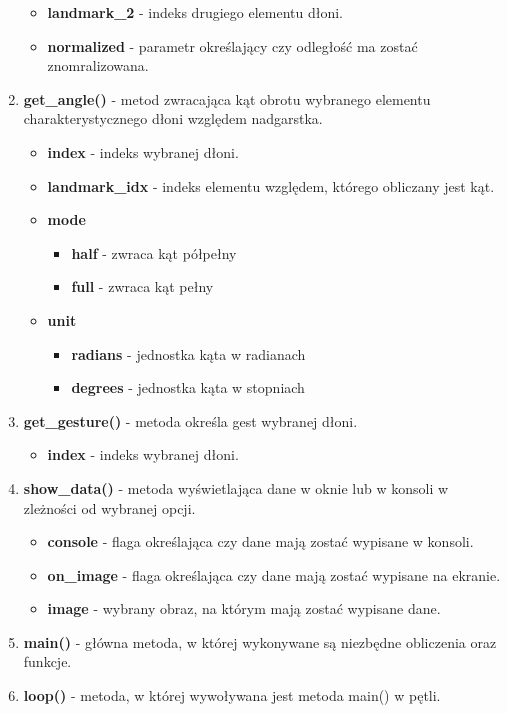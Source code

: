 \begin{enumerate}
\begin{itemize}
        \item \textbf{landmark\_2} - indeks drugiego elementu dłoni. 
        \item \textbf{normalized} - parametr określający czy odległość ma zostać znomralizowana. 
    \end{itemize}
    \item \textbf{get\_angle()} - metod zwracająca kąt obrotu wybranego elementu charakterystycznego dłoni względem nadgarstka. 
    \begin{itemize}
        \item \textbf{index} - indeks wybranej dłoni. 
        \item \textbf{landmark\_idx} - indeks elementu względem, którego obliczany jest kąt. 
        \item \textbf{mode}
        \begin{itemize}
            \item \textbf{half} - zwraca kąt półpełny
            \item \textbf{full} - zwraca kąt pełny
        \end{itemize}
        \item \textbf{unit}
        \begin{itemize}
            \item \textbf{radians} - jednostka kąta w radianach
            \item \textbf{degrees} - jednostka kąta w stopniach
        \end{itemize}
    \end{itemize}
    \item \textbf{get\_gesture()} - metoda określa gest wybranej dłoni. 
    \begin{itemize}
        \item \textbf{index} - indeks wybranej dłoni. 
    \end{itemize}
    \item \textbf{show\_data()} - metoda wyświetlająca dane w oknie lub w konsoli w zleżności od wybranej opcji. 
    \begin{itemize}
        \item \textbf{console} - flaga określająca czy dane mają zostać wypisane w konsoli.
        \item \textbf{on\_image} - flaga określająca czy dane mają zostać wypisane na ekranie. 
        \item \textbf{image} - wybrany obraz, na którym mają zostać wypisane dane.
    \end{itemize}
    \item \textbf{main()} - główna metoda, w której wykonywane są niezbędne obliczenia oraz funkcje. 
    \item \textbf{loop()} - metoda, w której wywoływana jest metoda main() w pętli. 
\end{enumerate}

